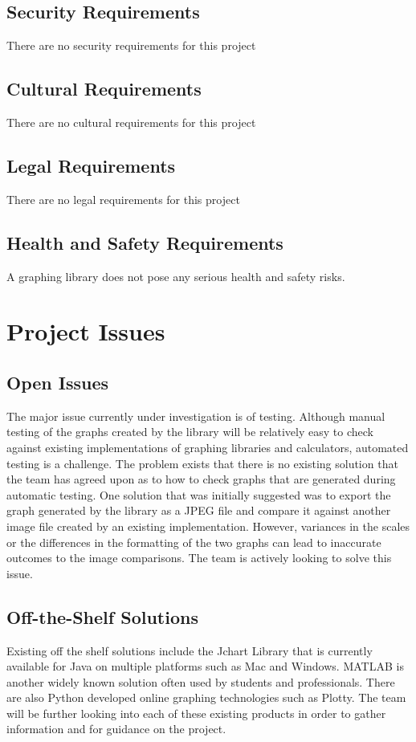 \documentclass[12pt, titlepage]{article}
\begin{document}
\subsection{Security Requirements}
There are no security requirements for this project
\subsection{Cultural Requirements}
There are no cultural requirements for this project
\subsection{Legal Requirements}
There are no legal requirements for this project
\subsection{Health and Safety Requirements} %

A graphing library does not pose any serious health and safety risks.

\clearpage
\section{Project Issues}

\subsection{Open Issues}
The major issue currently under investigation is of testing. Although manual testing of the graphs created by the library will be relatively easy to check against existing implementations of graphing libraries and calculators, automated testing is a challenge. The problem exists that there is no existing solution that the team has agreed upon as to how to check graphs that are generated during automatic testing. One solution that was initially suggested was to export the graph generated by the library as a JPEG file and compare it against another image file created by an existing implementation. However, variances in the scales or the differences in the formatting of the two graphs can lead to inaccurate outcomes to the image comparisons. The team is actively looking to solve this issue. 
\subsection{Off-the-Shelf Solutions}
Existing off the shelf solutions include the Jchart Library that is currently available for Java on multiple platforms such as Mac and Windows. MATLAB is another widely known solution often used by students and professionals. There are also Python developed online graphing technologies such as Plotty. The team will be further looking into each of these existing products in order to gather information and for guidance on the project. 
\end{document}
